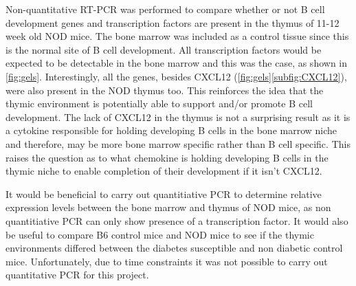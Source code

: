 Non-quantitative RT-PCR was performed to compare whether or not B cell development genes and transcription factors are present in the thymus of 11-12 week old NOD mice.
The bone marrow was included as a control tissue since this is the normal site of B cell development.
All transcription factors would be expected to be detectable in the bone marrow and this was the case, as shown in \cref{fig:gels}.
Interestingly, all the genes, besides CXCL12 (\cref{fig:gels}\ref{subfig:CXCL12}), were also present in the NOD thymus too.
This reinforces the idea that the thymic environment is potentially able to support and/or promote B cell development.
The lack of CXCL12 in the thymus is not a surprising result as it is a cytokine responsible for holding developing B cells in the bone marrow niche and therefore, may be more bone marrow specific rather than B cell specific.
This raises the question as to what chemokine is holding developing B cells in the thymic niche to enable completion of their development if it isn't CXCL12.

It would be beneficial to carry out quantitiative PCR to determine relative expression levels between the bone marrow and thymus of NOD mice, as non quantitiative PCR can only show presence of a transcription factor.
It would also be useful to compare B6 control mice and NOD mice to see if the thymic environments differed between the diabetes susceptible and non diabetic control mice.
Unfortunately, due to time constraints it was not possible to carry out quantitative PCR for this project.

